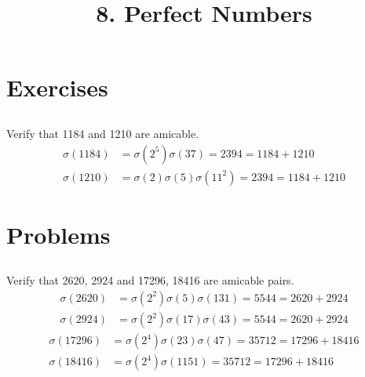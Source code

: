 \documentclass{article}
\begin{document}
\newcommand{\Z}{\mathbb{Z}}
\newcommand{\s}{\sigma}
\newcommand{\Mod}[1]{\ (\mathrm{mod}\ #1)}

\title{8. Perfect Numbers}
\section{Exercises}

\subsection{}
Verify that 1184 and 1210 are amicable.
\begin{align*}
    \s(1184) &= \s(2^5)\s(37) = 2394 = 1184 + 1210\\
    \s(1210) &= \s(2)\s(5)\s(11^2) = 2394 = 1184 + 1210
\end{align*}

\section{Problems}

\subsection{}
Verify that 2620, 2924 and 17296, 18416 are amicable pairs.
\begin{align*}
    \s(2620) &= \s(2^2)\s(5)\s(131) = 5544 = 2620 + 2924\\
    \s(2924) &= \s(2^2)\s(17)\s(43) = 5544 = 2620 + 2924
\end{align*}
\begin{align*}
    \s(17296) &= \s(2^4)\s(23)\s(47) = 35712 = 17296 + 18416\\
    \s(18416) &= \s(2^4)\s(1151) = 35712 = 17296 + 18416
\end{align*}

\end{document}
